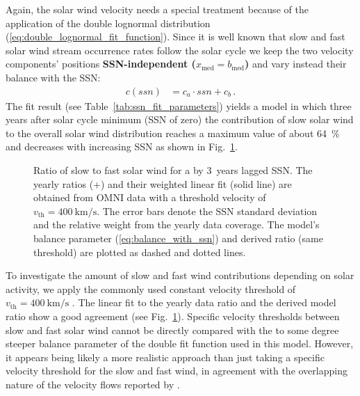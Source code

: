 Again, the solar wind velocity needs a special treatment because of the application of the double lognormal distribution (\ref{eq:double_lognormal_fit_function}). Since it is well known that slow and fast solar wind stream occurrence rates follow the solar cycle we keep the two velocity components' positions \textbf{SSN-independent ($x_\text{med} =  b_\text{med}$)} and vary instead their balance with the SSN:
\begin{align}
	c(ssn) &= c_a \cdot ssn + c_b\,.	\label{eq:balance_with_ssn}
\end{align}
The fit result (see Table~\ref{tab:ssn_fit_parameters}) yields a model in which three years after solar cycle minimum (SSN of zero) the contribution of slow solar wind to the overall solar wind distribution reaches a maximum value of about \SI{64}{\percent} and decreases with increasing SSN as shown in Fig.~\ref{fig:Vdbl_SSN_ratio_f_plot}.
\begin{figure}
	\caption{Ratio of slow to fast solar wind for a by 3~years lagged SSN. The yearly ratios (+) and their weighted linear fit (solid line) are obtained from OMNI data with a threshold velocity of $v_\text{th} = \SI{400}{\km\per\s}$. The error bars denote the SSN standard deviation and the relative weight from the yearly data coverage. The model's balance parameter (\ref{eq:balance_with_ssn}) and derived ratio (same threshold) are plotted as dashed and dotted lines.}
	\label{fig:Vdbl_SSN_ratio_f_plot}
\end{figure}

To investigate the amount of slow and fast wind contributions depending on solar activity, we apply the commonly used constant velocity threshold of $v_\text{th} = \SI{400}{\km\per\s}$ \citep[p.~144]{Schwenn1990}. The linear fit to the yearly data ratio and the derived model ratio show a good agreement (see Fig.~\ref{fig:Vdbl_SSN_ratio_f_plot}). Specific velocity thresholds between slow and fast solar wind cannot be directly compared with the to some degree steeper balance parameter of the double fit function used in this model. However, it appears being likely a more realistic approach than just taking a specific velocity threshold for the slow and fast wind, in agreement with the overlapping nature of the velocity flows reported by \citet{McGregor2011b}.


